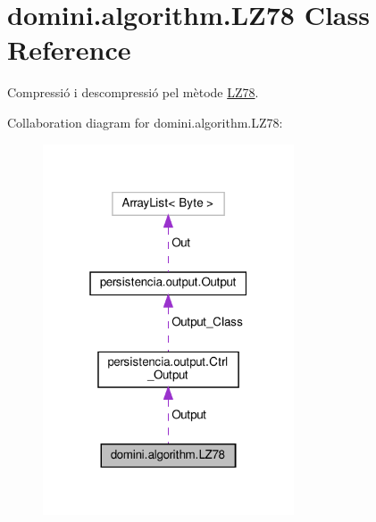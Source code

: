 \hypertarget{classdomini_1_1algorithm_1_1LZ78}{}\section{domini.\+algorithm.\+L\+Z78 Class Reference}
\label{classdomini_1_1algorithm_1_1LZ78}


Compressió i descompressió pel mètode \hyperlink{classdomini_1_1algorithm_1_1LZ78}{L\+Z78}.  




Collaboration diagram for domini.\+algorithm.\+L\+Z78\+:\nopagebreak
\begin{figure}[H]
\begin{center}
\leavevmode
\includegraphics[width=211pt]{classdomini_1_1algorithm_1_1LZ78__coll__graph}
\end{center}
\end{figure}
